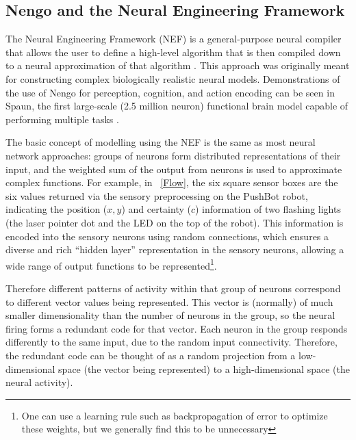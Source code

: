 \documentclass[conference]{IEEEtran}
\begin{document}
\subsection{Nengo and the Neural Engineering Framework}

The Neural Engineering Framework (NEF) is a general-purpose neural compiler 
that allows the user to define a high-level algorithm that is then compiled 
down to a neural approximation of that algorithm \cite{eliasmith2004neural}. 
This approach was originally meant for constructing complex biologically realistic neural 
models. Demonstrations of the use of Nengo for perception, cognition, and 
action encoding can be seen in Spaun, the first large-scale 
(2.5 million neuron) functional brain model capable of performing multiple 
tasks  \cite{eliasmith_largescale_2012}. 

The basic concept of modelling using the NEF is the same as most neural network
approaches: groups of neurons form distributed representations of their input,
and the weighted sum of the output from neurons is used to approximate
complex functions.  For example, in \figurename~\ref{Flow}, the six square
sensor boxes are the six values returned via the sensory preprocessing on the
PushBot robot, indicating the position ($x, y$) and certainty ($c$) information 
of two flashing lights (the laser pointer dot and the LED on the top of the
robot).  This information is encoded into the sensory neurons using random
connections, which ensures a diverse and rich ``hidden layer''
representation in the sensory neurons, allowing a wide range of output
functions to be represented\footnote{One can use a
learning rule such as backpropagation of error to optimize these weights,
but we generally find this to be unnecessary}.

Therefore different patterns of activity within
that group of neurons correspond to different vector values being represented.
This vector is (normally) of much smaller dimensionality than the number of 
neurons in the group, so the neural firing forms a redundant code for that 
vector. Each neuron in the group responds differently to the same input, due
to the random input connectivity. Therefore, the redundant code can be thought of as a 
random projection from a low-dimensional space (the vector being represented) 
to a high-dimensional space (the neural activity). 
\end{document}
